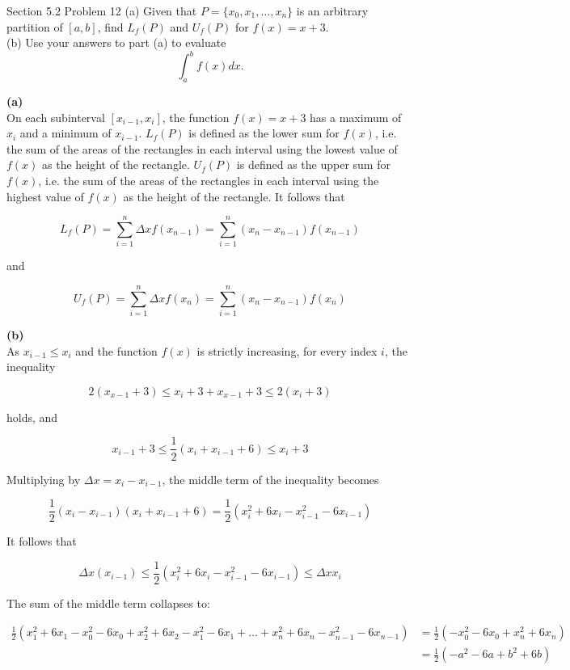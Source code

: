 \documentclass{article}
\begin{document}
    \begin{tbhtheorem}{Section 5.2 Problem 12}
        (a) Given that $P = \{x_0, x_1, \dots, x_n\}$ is an arbitrary partition of $[a,b]$, find $L_f (P)$ and $U_f(P)$ for $f(x)=x+3$. \\
        (b) Use your answers to part (a) to evaluate
        \[
            \int^b_a f(x)dx.
        \]
    \end{tbhtheorem}

    \textbf{(a)} \\
    On each subinterval $[x_{i-1}, x_i]$, the function $f(x)=x+3$ has a maximum of $x_i$ and a minimum of $x_{i-1}$. $L_f (P)$ is defined as the lower sum for $f(x)$, i.e. the sum of the areas of the rectangles
    in each interval using the lowest value of $f(x)$ as the height of the rectangle. $U_f (P)$ is defined as the upper sum for $f(x)$, i.e. the sum of the areas of the rectangles in each interval using the highest value
    of $f(x)$ as the height of the rectangle. It follows that

    \[
        L_f (P) = \sum^n_{i=1} \Delta x f(x_{n-1}) = \sum^n_{i=1} (x_n - x_{n-1})f(x_{n-1})
    \]

    and

    \[
        U_f (P) = \sum^n_{i=1} \Delta x f(x_n) = \sum^n_{i=1} (x_n - x_{n-1}) f(x_n)
    \]

    \textbf{(b)} \\
    As $x_{i-1} \leq x_i$ and the function $f(x)$ is strictly increasing, for every index $i$, the inequality

    \[
        2(x_{x-1}+3) \leq x_i + 3 + x_{x-1} + 3 \leq 2(x_i + 3)
    \]

    holds, and

    \[
        x_{i-1} + 3 \leq \frac{1}{2}(x_i + x_{i-1} + 6) \leq x_i + 3
    \]

    Multiplying by $\Delta x = x_i - x_{i-1}$, the middle term of the inequality becomes

    \[
        \frac{1}{2}(x_i - x_{i-1})(x_i + x_{i-1} + 6) = \frac{1}{2}(x^2_i + 6x_i - x^2_{i-1} - 6x_{i-1})
    \]

    It follows that

    \[
        \Delta x (x_{i-1}) \leq \frac{1}{2} (x^2_i + 6x_i - x^2_{i-1} - 6x_{i-1}) \leq \Delta x x_i
    \]

    \pagebreak
    \thispagestyle{3}

    The sum of the middle term collapses to:

    \begin{align*}
        \frac{1}{2} (x^2_1 + 6x_1 - x^2_0 - 6x_0 + x^2_2 + 6x_2 - x^2_1 - 6x_1 + \dots + x^2_n + 6x_n - x^2_{n-1} - 6x_{n-1})   &= \frac{1}{2}(-x^2_0 - 6x_0 + x^2_n + 6x_n) \\
                                                                                                                                &= \frac{1}{2}(-a^2 - 6a + b^2 + 6b)
    \end{align*}
\end{document}

